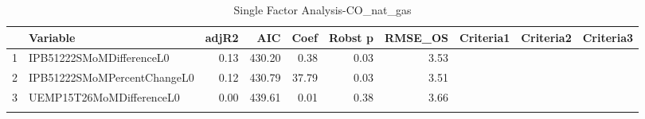 \begin{longtable}{rlrrrrrlll}
  \hline
 & Variable & adjR2 & AIC & Coef & Robst p & RMSE\_OS & Criteria1 & Criteria2 & Criteria3 \\ 
  \hline
1 & IPB51222SMoMDifferenceL0 & 0.13 & 430.20 & 0.38 & 0.03 & 3.53 &  &  &  \\ 
  2 & IPB51222SMoMPercentChangeL0 & 0.12 & 430.79 & 37.79 & 0.03 & 3.51 &  &  &  \\ 
  3 & UEMP15T26MoMDifferenceL0 & 0.00 & 439.61 & 0.01 & 0.38 & 3.66 &  &  &  \\ 
   \hline
\hline
\caption{Single Factor Analysis-CO_nat_gas} 
\end{longtable}
